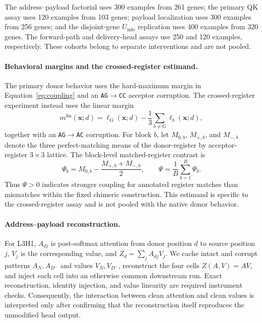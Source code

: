 \documentclass{article}
\newcommand{\Uinfo}{\ensuremath{U_{\mathrm{info}}}}
\begin{document}
The address--payload factorial uses 300 examples from 261 genes; the primary QK assay uses 120 examples from 103 genes; payload localization uses 300 examples from 256 genes; and the disjoint-gene \Uinfo{} replication uses 400 examples from 320 genes. The forward-path and delivery-head assays use 250 and 120 examples, respectively. These cohorts belong to separate interventions and are not pooled.

\paragraph{Behavioral margins and the crossed-register estimand.}
The primary donor behavior uses the hard-maximum margin in Equation~\ref{eq:coupling} and an \texttt{AG}\(\rightarrow\)\texttt{CC} acceptor corruption. The crossed-register experiment instead uses the linear margin
\begin{equation}
m^{\mathrm{lin}}(\mathbf{x};d)
=
\ell_{\mathrm G}(\mathbf{x};d)
-\frac{1}{3}\sum_{b\neq\mathrm G}\ell_b(\mathbf{x};d),
\label{eq:linear_margin}
\end{equation}
together with an \texttt{AG}\(\rightarrow\)\texttt{AC} corruption. For block \(b\), let \(M_{0,b}\), \(M_{+,b}\), and \(M_{-,b}\) denote the three perfect-matching means of the donor-register by acceptor-register \(3\times3\) lattice. The block-level matched-register contrast is
\begin{equation}
\Psi_b
=
M_{0,b}
-\frac{M_{+,b}+M_{-,b}}{2},
\qquad
\Psi
=
\frac{1}{B}\sum_{b=1}^{B}\Psi_b .
\label{eq:register_contrast}
\end{equation}
Thus \(\Psi>0\) indicates stronger coupling for annotated register matches than mismatches within the fixed chimeric construction. This estimand is specific to the crossed-register assay and is not pooled with the native donor behavior.

\paragraph{Address--payload reconstruction.}
For L3H1, \(A_{dj}\) is post-softmax attention from donor position \(d\) to source position \(j\), \(V_j\) is the corresponding value, and \(Z_d=\sum_j A_{dj}V_j\). We cache intact and corrupt patterns \(A_N,A_{D^-}\) and values \(V_N,V_{D^-}\), reconstruct the four cells \(Z(A,V)=AV\), and inject each cell into an otherwise common downstream run. Exact reconstruction, identity injection, and value linearity are required instrument checks. Consequently, the interaction between clean attention and clean values is interpreted only after confirming that the reconstruction itself reproduces the unmodified head output.
\end{document}
